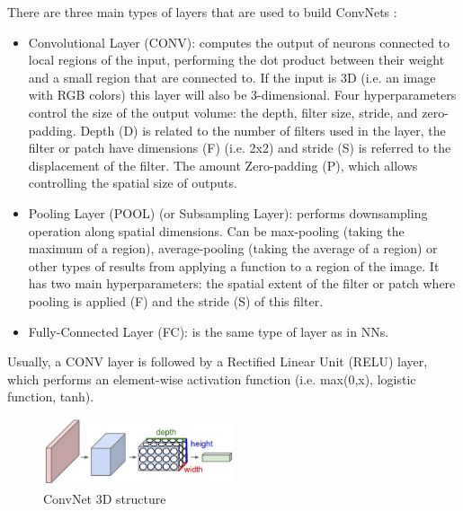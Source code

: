\documentclass[]{article}
\begin{document}
There are three main types of layers that are used to build ConvNets \cite{cs231convnets}: %
\begin{itemize}
	\item Convolutional Layer (CONV): computes the output of neurons connected to local regions of the input, performing the dot product between their weight and a small region that are connected to. If the input is 3D (i.e. an image with RGB colors) this layer will also be 3-dimensional. Four hyperparameters control the size of the output volume: the depth, filter size, stride, and zero-padding. Depth (D) is related to the number of filters used in the layer, the filter or patch have dimensions (F) (i.e. 2x2) and stride (S) is referred to the displacement of the filter. The amount Zero-padding (P), which allows controlling the spatial size of outputs.
	\item Pooling Layer (POOL) (or Subsampling Layer): performs downsampling operation along spatial dimensions. Can be max-pooling (taking the maximum of a region), average-pooling (taking the average of a region) or other types of results from applying a function to a region of the image. It has two main hyperparameters: the spatial extent of the filter or patch where pooling is applied (F) and the stride (S) of this filter.
	\item Fully-Connected Layer (FC): is the same type of layer as in NNs.
\end{itemize}

Usually, a CONV layer is followed by a Rectified Linear Unit (RELU) layer, which performs an element-wise activation function (i.e. max(0,x), logistic function, tanh).

\begin{figure}[htpb!]
\centering
\includegraphics[width= 0.5\textwidth]{images/cnn}
\caption{ConvNet 3D structure \cite{cs231convnets}\label{img:cnn}}
\end{figure}
\end{document}
